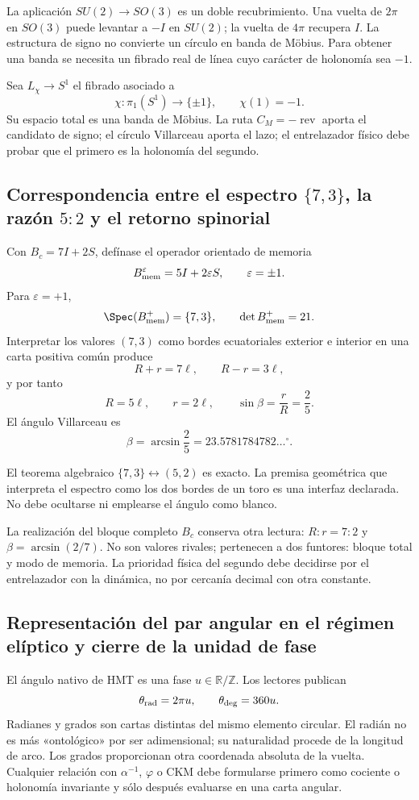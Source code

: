 La aplicación \(SU(2)\to SO(3)\) es un doble recubrimiento. Una vuelta de
\(2\pi\) en \(SO(3)\) puede levantar a \(-I\) en \(SU(2)\); la vuelta de
\(4\pi\) recupera \(I\). La estructura de signo no convierte un círculo en
banda de Möbius. Para obtener una banda se necesita un fibrado real de línea
cuyo carácter de holonomía sea \(-1\).

Sea \(L_\chi\to S^1\) el fibrado asociado a
\[
\chi:\pi_1(S^1)\longrightarrow\{\pm1\},
\qquad \chi(1)=-1.
\]
Su espacio total es una banda de Möbius. La ruta \(C_M=-\operatorname{rev}\)
aporta el candidato de signo; el círculo Villarceau aporta el lazo; el
entrelazador físico debe probar que el primero es la holonomía del segundo.

\subsection{Correspondencia entre el espectro \texorpdfstring{\(\{7,3\}\)}{{7,3}}, la razón \texorpdfstring{\(5{:}2\)}{5:2} y el retorno spinorial}

Con \(B_c=7I+2S\), defínase el operador orientado de memoria
\[
B_{\rm mem}^{\varepsilon}=5I+2\varepsilon S,
\qquad\varepsilon=\pm1.
\]
Para \(\varepsilon=+1\),
\[
\Spec(B_{\rm mem}^{+})=\{7,3\},
\qquad\det B_{\rm mem}^{+}=21.
\]
Interpretar los valores \((7,3)\) como bordes ecuatoriales exterior e interior
en una carta positiva común produce
\[
R+r=7\ell,\qquad R-r=3\ell,
\]
y por tanto
\[
R=5\ell,\qquad r=2\ell,\qquad
\sin\beta=\frac rR=\frac25.
\]
El ángulo Villarceau es
\[
\beta=\arcsin\frac25
=23.5781784782\ldots^\circ.
\]

El teorema algebraico \(\{7,3\}\leftrightarrow(5,2)\) es exacto. La premisa
geométrica que interpreta el espectro como los dos bordes de un toro es una
interfaz declarada. No debe ocultarse ni emplearse el ángulo como blanco.

La realización del bloque completo \(B_c\) conserva otra lectura:
\(R:r=7:2\) y \(\beta=\arcsin(2/7)\). No son valores rivales; pertenecen a
dos funtores: bloque total y modo de memoria. La prioridad física del segundo
debe decidirse por el entrelazador con la dinámica, no por cercanía decimal con
otra constante.

\subsection{Representación del par angular en el régimen elíptico y cierre de la unidad de fase}

El ángulo nativo de HMT es una fase \(u\in\mathbb R/\mathbb Z\). Los lectores
publican
\[
\theta_{\rm rad}=2\pi u,
\qquad
\theta_{\rm deg}=360u.
\]
Radianes y grados son cartas distintas del mismo elemento circular. El radián
no es más «ontológico» por ser adimensional; su naturalidad procede de la
longitud de arco. Los grados proporcionan otra coordenada absoluta de la
vuelta. Cualquier relación con \(\alpha^{-1}\), \(\varphi\) o CKM debe
formularse primero como cociente o holonomía invariante y sólo después
evaluarse en una carta angular.

